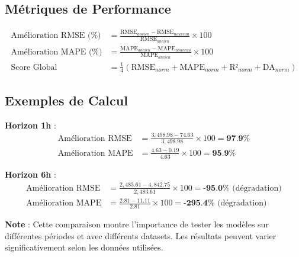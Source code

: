 \documentclass[12pt,a4paper]{article}
\begin{document}
\subsection{Métriques de Performance}

\begin{align}
    \text{Amélioration RMSE (\%)} &= \frac{\text{RMSE}_{ancien} - \text{RMSE}_{nouveau}}{\text{RMSE}_{ancien}} \times 100 \\
    \text{Amélioration MAPE (\%)} &= \frac{\text{MAPE}_{ancien} - \text{MAPE}_{nouveau}}{\text{MAPE}_{ancien}} \times 100 \\
    \text{Score Global} &= \frac{1}{4}\left(\text{RMSE}_{norm} + \text{MAPE}_{norm} + \text{R²}_{norm} + \text{DA}_{norm}\right)
\end{align}

\subsection{Exemples de Calcul}

\textbf{Horizon 1h} :
\begin{align}
    \text{Amélioration RMSE} &= \frac{3,498.98 - 74.63}{3,498.98} \times 100 = \textbf{97.9\%} \\
    \text{Amélioration MAPE} &= \frac{4.63 - 0.19}{4.63} \times 100 = \textbf{95.9\%}
\end{align}

\textbf{Horizon 6h} :
\begin{align}
    \text{Amélioration RMSE} &= \frac{2,483.61 - 4,842.75}{2,483.61} \times 100 = \textbf{-95.0\%} \text{ (dégradation)} \\
    \text{Amélioration MAPE} &= \frac{2.81 - 11.11}{2.81} \times 100 = \textbf{-295.4\%} \text{ (dégradation)}
\end{align}

\vspace{1cm}

\noindent\textbf{Note} : Cette comparaison montre l'importance de tester les modèles sur différentes périodes et avec différents datasets. Les résultats peuvent varier significativement selon les données utilisées.
\end{document}
